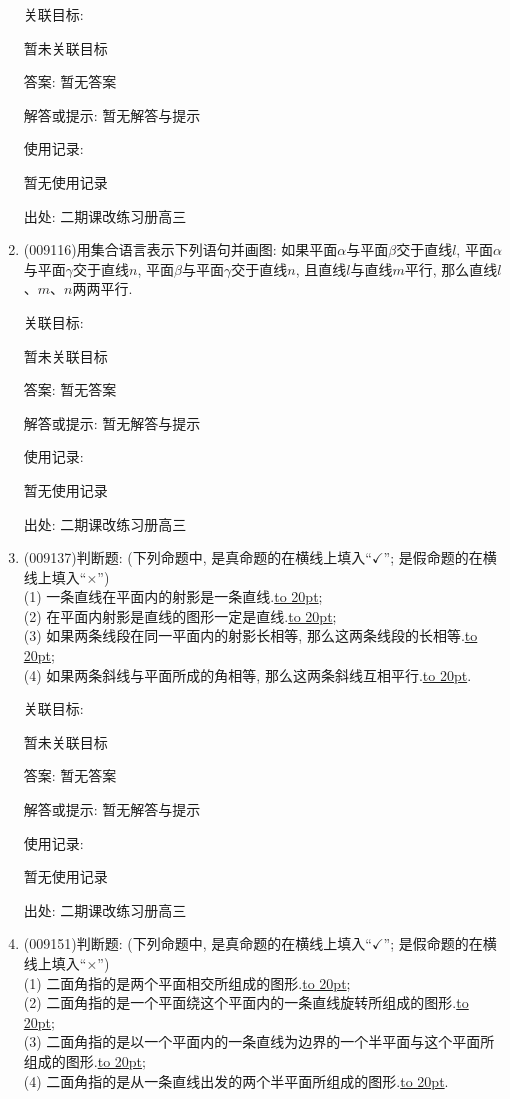 \documentclass[10pt,a4paper]{article}
\newcommand{\blank}[1]{\underline{\hbox to #1pt{}}}
\begin{document}
\begin{enumerate}[1.]
关联目标:

暂未关联目标

答案: 暂无答案

解答或提示: 暂无解答与提示

使用记录:

暂无使用记录


出处: 二期课改练习册高三
\item { (009116)}用集合语言表示下列语句并画图:
如果平面$\alpha$与平面$\beta$交于直线$l$, 平面$\alpha$与平面$\gamma$交于直线$n$, 平面$\beta$与平面$\gamma$交于直线$n$, 且直线$l$与直线$m$平行, 那么直线$l$、$m$、$n$两两平行.


关联目标:

暂未关联目标

答案: 暂无答案

解答或提示: 暂无解答与提示

使用记录:

暂无使用记录


出处: 二期课改练习册高三
\item { (009137)}判断题: (下列命题中, 是真命题的在横线上填入``$\checkmark$''; 是假命题的在横线上填入``$\times$'')\\
(1) 一条直线在平面内的射影是一条直线.\blank{20};\\
(2) 在平面内射影是直线的图形一定是直线.\blank{20};\\
(3) 如果两条线段在同一平面内的射影长相等, 那么这两条线段的长相等.\blank{20};\\
(4) 如果两条斜线与平面所成的角相等, 那么这两条斜线互相平行.\blank{20}.


关联目标:

暂未关联目标

答案: 暂无答案

解答或提示: 暂无解答与提示

使用记录:

暂无使用记录


出处: 二期课改练习册高三
\item { (009151)}判断题: (下列命题中, 是真命题的在横线上填入``$\checkmark$''; 是假命题的在横线上填入``$\times$'')\\
(1) 二面角指的是两个平面相交所组成的图形.\blank{20};\\
(2) 二面角指的是一个平面绕这个平面内的一条直线旋转所组成的图形.\blank{20};\\
(3) 二面角指的是以一个平面内的一条直线为边界的一个半平面与这个平面所组成的图形.\blank{20};\\
(4) 二面角指的是从一条直线出发的两个半平面所组成的图形.\blank{20}.



\end{enumerate}
\end{document}
